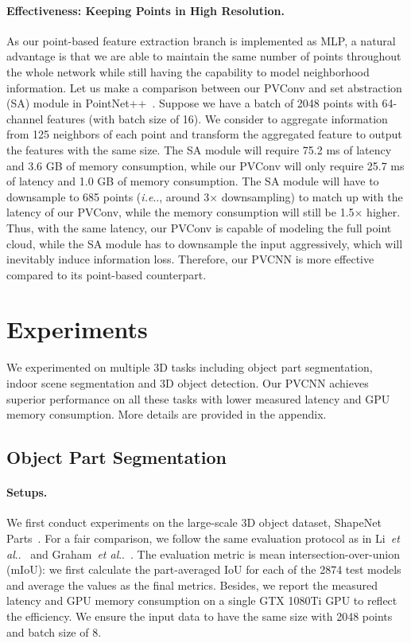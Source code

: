 \documentclass{article}
\makeatletter
\DeclareRobustCommand\onedot{\futurelet\@let@token\@onedot}
\def\@onedot{\ifx\@let@token.\else.\null\fi\xspace}
\def\ie{\emph{i.e}\onedot} \def\Ie{\emph{I.e}\onedot}
\def\etal{\emph{et al}\onedot}
\newcommand{\myparagraph}[1]{\vspace{-6pt}\paragraph{#1}}
\def\modelshort{PVCNN\xspace}
\def\convshort{PVConv\xspace}
\makeatother
\begin{document}
\myparagraph{Effectiveness: Keeping Points in High Resolution.}

As our point-based feature extraction branch is implemented as MLP, a natural advantage is that we are able to maintain the same number of points throughout the whole network while still having the capability to model neighborhood information. Let us make a comparison between our \convshort and set abstraction (SA) module in PointNet++~\cite{Qi:2017tf}. Suppose we have a batch of 2048 points with 64-channel features (with batch size of 16). We consider to aggregate information from 125 neighbors of each point and transform the aggregated feature to output the features with the same size. The SA module will require 75.2 ms of latency and 3.6 GB of memory consumption, while our \convshort will only require 25.7 ms of latency and 1.0 GB of memory consumption. The SA module will have to downsample to 685 points (\ie, around 3$\times$ downsampling) to match up with the latency of our \convshort, while the memory consumption will still be 1.5$\times$ higher. Thus, with the same latency, our \convshort is capable of modeling the full point cloud, while the SA module has to downsample the input aggressively, which will inevitably induce information loss. Therefore, our \modelshort is more effective compared to its point-based counterpart. \section{Experiments}
\label{sec:exp}

We experimented on multiple 3D tasks including object part segmentation, indoor scene segmentation and 3D object detection. Our \modelshort achieves superior performance on all these tasks with lower measured latency and GPU memory consumption. More details are provided in the appendix.

\subsection{Object Part Segmentation}

\paragraph{Setups.}

We first conduct experiments on the large-scale 3D object dataset, ShapeNet Parts~\cite{Chang:2015sn}. For a fair comparison, we follow the same evaluation protocol as in Li~\etal~\cite{Li:2018tp} and Graham~\etal~\cite{Graham:2018ss}. The evaluation metric is mean intersection-over-union (mIoU): we first calculate the part-averaged IoU for each of the 2874 test models and average the values as the final metrics. Besides, we report the measured latency and GPU memory consumption on a single GTX 1080Ti GPU to reflect the efficiency. We ensure the input data to have the same size with 2048 points and batch size of 8.
\end{document}

